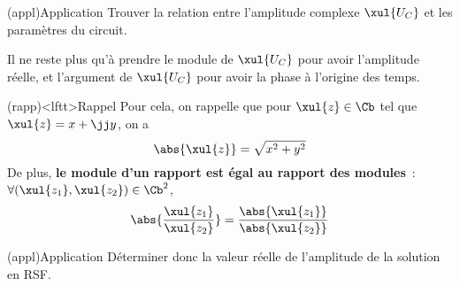 \documentclass[../../main/main.tex]{subfiles}
\begin{document}
\begin{tcb}(appl){Application}
	Trouver la relation entre l'amplitude complexe $\xul{U_C}$ et les paramètres
	du circuit.
	\tcblower
	\begin{isd}[lefthand ratio=.3]
		\tcblower
	\end{isd}
\end{tcb}
Il ne reste plus qu'à prendre le module de $\xul{U_C}$ pour avoir l'amplitude
réelle, et l'argument de $\xul{U_C}$ pour avoir la phase à l'origine des
temps.
\begin{tcb}[sidebyside](rapp)<lftt>{Rappel}
	Pour cela, on rappelle que pour $\xul{z} \in \Cb$ tel que $\xul{z} = x + \jj
		y$, on a
	\[ \abs{\xul{z}} = \sqrt{x^2 + y^2}\]
	\tcblower
	De plus, \textbf{le module d'un rapport est égal au rapport des modules}~:
	$\forall (\xul{z_1}, \xul{z_2}) \in \Cb^2$,
	\[
		\abs{\frac{\xul{z_1}}{\xul{z_2}}} =
		\frac{\abs{\xul{z_1}}}{\abs{\xul{z_2}}}
	\]
\end{tcb}
\begin{tcb}(appl){Application}
	Déterminer donc la valeur réelle de l'amplitude de la solution en RSF.
	\tcblower
\end{tcb}
\end{document}
